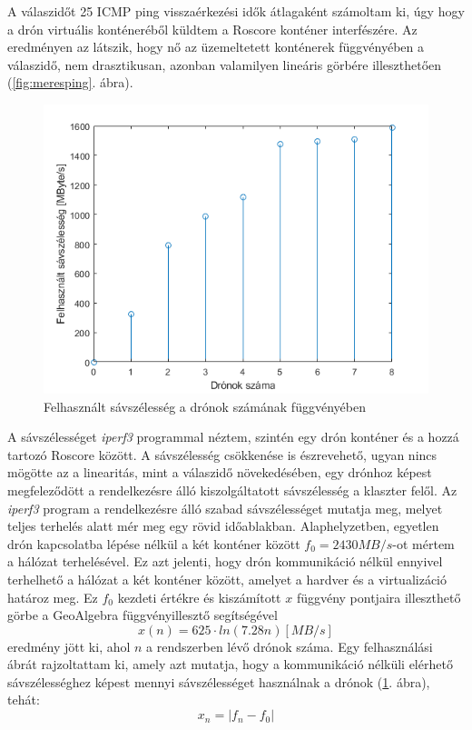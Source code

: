 \noindent
A válaszidőt 25 ICMP ping visszaérkezési idők átlagaként számoltam ki, úgy hogy a drón virtuális konténeréből küldtem a Roscore konténer interfészére. Az eredményen az látszik, hogy nő az üzemeltetett konténerek függvényében a válaszidő, nem drasztikusan, azonban valamilyen lineáris görbére illeszthetően (\ref{fig:meresping}. ábra).  \\

\begin{figure}
	\centering
	\includegraphics{figures/meres_iperf_inv.png}
	\caption{Felhasznált sávszélesség a drónok számának függvényében}
	\label{fig:meresiperf}
\end{figure}

\noindent
A sávszélességet \emph{iperf3} programmal néztem, szintén egy drón konténer és a hozzá tartozó Roscore között. A sávszélesség csökkenése is észrevehető, ugyan nincs mögötte az a linearitás, mint a válaszidő növekedésében, egy drónhoz képest megfeleződött a rendelkezésre álló kiszolgáltatott sávszélesség a klaszter felől. Az \emph{iperf3} program a rendelkezésre álló szabad sávszélességet mutatja meg, melyet teljes terhelés alatt mér meg egy rövid időablakban. Alaphelyzetben, egyetlen drón kapcsolatba lépése nélkül a két konténer között $f_{0}=2430 MB/s$-ot mértem a hálózat terhelésével. Ez azt jelenti, hogy drón kommunikáció nélkül ennyivel terhelhető a hálózat a két konténer között, amelyet a hardver és a virtualizáció határoz meg. Ez $f_0$ kezdeti értékre és kiszámított $x$ függvény pontjaira illeszthető görbe a GeoAlgebra függvényillesztő segítségével \begin{equation} x(n) = 625 \cdot ln(7.28n) [MB/s] \end{equation} eredmény jött ki, ahol $n$ a rendszerben lévő drónok száma. Egy felhasználási ábrát rajzoltattam ki, amely azt mutatja, hogy a kommunikáció nélküli elérhető sávszélességhez képest mennyi sávszélességet használnak a drónok (\ref{fig:meresiperf}. ábra), tehát: \begin{equation}x_n = | f_n - f_0 |\end{equation}  \\

